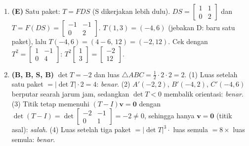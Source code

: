 \documentclass[a4paper,11pt]{article}
\newcounter{no}
\begin{document}
\begin{enumerate}[leftmargin=2em,itemsep=2pt,topsep=2pt]
\item[\textbf{19.}] \textbf{(E)} Satu paket: $T=FDS$ (S dikerjakan lebih dulu). $DS=\begin{bmatrix}1&1\\0&2\end{bmatrix}$ dan $T=F(DS)=\begin{bmatrix}-1&-1\\0&2\end{bmatrix}$. $T(1,3)=(-4,6)$ (jebakan D: baru satu paket), lalu $T(-4,6)=(4-6,\,12)=(-2,12)$. Cek dengan $T^2=\begin{bmatrix}1&-1\\0&4\end{bmatrix}$: $T^2\begin{bmatrix}1\\3\end{bmatrix}=\begin{bmatrix}-2\\12\end{bmatrix}$.
\item[\textbf{20.}] \textbf{(B, B, S, B)} $\det T=-2$ dan luas $\triangle ABC=\frac12\cdot2\cdot2=2$. (1) Luas setelah satu paket $=|\det T|\cdot2=4$: \emph{benar}. (2) $A'(-2,2)$, $B'(-4,2)$, $C'(-4,6)$ berputar searah jarum jam, sedangkan $\det T<0$ membalik orientasi: \emph{benar}. (3) Titik tetap memenuhi $(T-I)\mathbf{v}=\mathbf{0}$ dengan $\det(T-I)=\det\begin{bmatrix}-2&-1\\0&1\end{bmatrix}=-2\ne0$, sehingga hanya $\mathbf{v}=\mathbf{0}$ (titik asal): \emph{salah}. (4) Luas setelah tiga paket $=|\det T|^{3}\cdot$ luas semula $=8\times$ luas semula: \emph{benar}.
\end{enumerate}
\par{}\par\vspace{0.2em}
\end{document}
